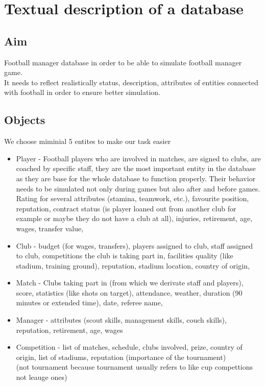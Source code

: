 \documentclass{report}
\begin{document}
\chapter{Textual description of a database}
\section{Aim}

Football manager database in order to be able to simulate football manager game. \\ 
It needs to reflect realistically status, description, attributes of entities connected with football in order to ensure better simulation. \\ 


\section{Objects}
We choose miminial 5 entites to make our task easier \\ 
\begin{itemize}
    \item Player - Football players who are involved in matches, are signed to clubs, are coached by specific staff, they are the most important entity in the database as they are base for the whole database to function properly. Their behavior needs to be simulated not only during games but also after and before games.\\
    Rating for several attributes (stamina, teamwork, etc.), favourite position, reputation, contract status (is player loaned out from another club for example or maybe they do not have a club at all), injuries, retirement, age, wages, transfer value, 
    \item Club - budget (for wages, transfers), players assigned to club, staff assigned to club, competitions the club is taking part in, facilities quality (like stadium, training ground), reputation, stadium location, country of origin,
    \item Match - Clubs taking part in (from which we derivate staff and players), score, statistics (like shots on target), attendance, weather, duration (90 minutes or extended time), date, referee name,
    \item Manager - attributes (scout skills, management skills, couch skills), reputation, retirement, age, wages
    \item Competition - list of matches, schedule, clubs involved, prize, country of origin, list of stadiums, reputation (importance of the tournament)\\
    (not tournament because tournament usually refers to like cup compettions not leauge ones)
\end{itemize} 
\end{document}
